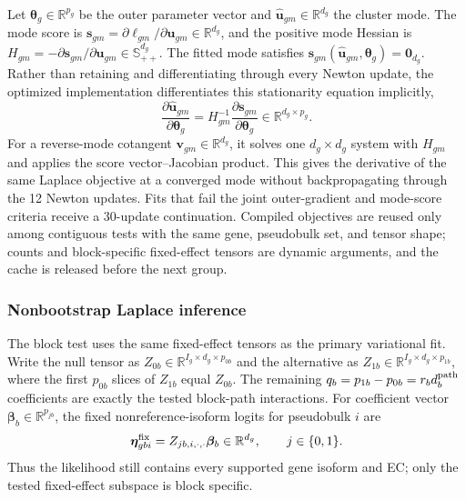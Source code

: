 \documentclass[11pt]{article}
\begin{document}
Let \(\bm\theta_g\in\mathbb R^{p_g}\) be the outer parameter vector and \(\widehat{\bm u}_{gm}\in\mathbb R^{d_g}\) the cluster mode. The mode score is \(\bm s_{gm}=\partial\ell_{gm}/\partial\bm u_{gm}\in\mathbb R^{d_g}\), and the positive mode Hessian is \(H_{gm}=-\partial\bm s_{gm}/\partial\bm u_{gm}\in\mathbb S_{++}^{d_g}\). The fitted mode satisfies \(\bm s_{gm}(\widehat{\bm u}_{gm},\bm\theta_g)=\bm0_{d_g}\). Rather than retaining and differentiating through every Newton update, the optimized implementation differentiates this stationarity equation implicitly, \[\frac{\partial\widehat{\bm u}_{gm}}{\partial\bm\theta_g}=H_{gm}^{-1}\frac{\partial\bm s_{gm}}{\partial\bm\theta_g}\in\mathbb R^{d_g\times p_g}.\] For a reverse-mode cotangent \(\bm v_{gm}\in\mathbb R^{d_g}\), it solves one \(d_g\times d_g\) system with \(H_{gm}\) and applies the score vector--Jacobian product. This gives the derivative of the same Laplace objective at a converged mode without backpropagating through the 12 Newton updates. Fits that fail the joint outer-gradient and mode-score criteria receive a 30-update continuation. Compiled objectives are reused only among contiguous tests with the same gene, pseudobulk set, and tensor shape; counts and block-specific fixed-effect tensors are dynamic arguments, and the cache is released before the next group.

\subsubsection*{Nonbootstrap Laplace inference}

The block test uses the same fixed-effect tensors as the primary variational fit. Write the null tensor as \(Z_{0b}\in\mathbb R^{I_g\times d_g\times p_{0b}}\) and the alternative as \(Z_{1b}\in\mathbb R^{I_g\times d_g\times p_{1b}}\), where the first \(p_{0b}\) slices of \(Z_{1b}\) equal \(Z_{0b}\). The remaining \(q_b=p_{1b}-p_{0b}=r_bd_b^{\rm path}\) coefficients are exactly the tested block-path interactions. For coefficient vector \(\bm\beta_b\in\mathbb R^{p_{jb}}\), the fixed nonreference-isoform logits for pseudobulk \(i\) are \[
 \bm\eta^{\rm fix}_{gbi}
 =Z_{jb,i,\cdot,\cdot}\bm\beta_b\in\mathbb R^{d_g},
 \qquad j\in\{0,1\}.
\]
Thus the likelihood still contains every supported gene isoform and EC; only the tested fixed-effect subspace is block specific.
\end{document}

